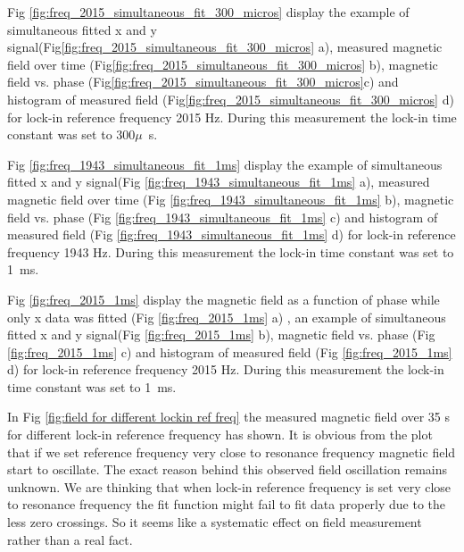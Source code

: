     Fig \ref{fig:freq_2015_simultaneous_fit_300_micros} display the example of simultaneous fitted x and y signal(Fig\ref{fig:freq_2015_simultaneous_fit_300_micros} a), measured magnetic field over time (Fig\ref{fig:freq_2015_simultaneous_fit_300_micros} b), magnetic field vs. phase (Fig\ref{fig:freq_2015_simultaneous_fit_300_micros}c) and histogram of measured field (Fig\ref{fig:freq_2015_simultaneous_fit_300_micros} d) for lock-in reference frequency 2015 Hz. During this measurement the lock-in time constant was set to 300$\mu$~s.
    
    Fig \ref{fig:freq_1943_simultaneous_fit_1ms} display the example of simultaneous fitted x and y signal(Fig \ref{fig:freq_1943_simultaneous_fit_1ms} a), measured magnetic field over time (Fig \ref{fig:freq_1943_simultaneous_fit_1ms} b), magnetic field vs. phase (Fig \ref{fig:freq_1943_simultaneous_fit_1ms} c) and histogram of measured field (Fig \ref{fig:freq_1943_simultaneous_fit_1ms} d) for lock-in reference frequency 1943 Hz. During this measurement the lock-in time constant was set to 1~ms. 
    
  Fig \ref{fig:freq_2015_1ms} display the magnetic field as a function of phase while only x data was fitted (Fig \ref{fig:freq_2015_1ms} a) , an example of simultaneous fitted x and y signal(Fig \ref{fig:freq_2015_1ms} b), magnetic field vs. phase (Fig \ref{fig:freq_2015_1ms} c) and histogram of measured field (Fig \ref{fig:freq_2015_1ms} d) for lock-in reference frequency 2015 Hz. During this measurement the lock-in time constant was set to 1~ms.  
  
  In Fig \ref{fig:field for different lockin ref freq} the measured magnetic field over 35 s for different lock-in reference frequency has shown. It is obvious from the plot that if we set reference frequency very close to resonance frequency magnetic field start to oscillate. The exact reason behind this observed field oscillation remains unknown. We are thinking that when lock-in reference frequency is set very close to resonance frequency the fit function might fail to fit data properly due to the less zero crossings. So it seems like a systematic effect on field measurement rather than a real fact.
   
